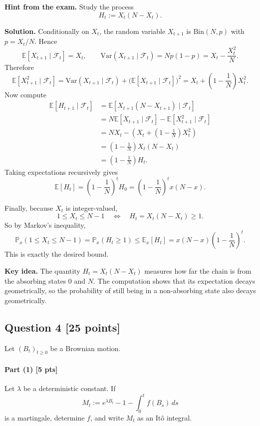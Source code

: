 \documentclass[11pt]{article}
\theoremstyle{definition}
\begin{document}
\textbf{Hint from the exam.} Study the process
\[
H_t:=X_t(N-X_t).
\]

\textbf{Solution.}
Conditionally on \(X_t\), the random variable \(X_{t+1}\) is \(\mathrm{Bin}(N,p)\) with \(p=X_t/N\). Hence
\[
\mathbb E[X_{t+1}\mid \mathcal F_t]=X_t,
\qquad
\mathrm{Var}(X_{t+1}\mid \mathcal F_t)=Np(1-p)=X_t-\frac{X_t^2}{N}.
\]
Therefore
\[
\mathbb E[X_{t+1}^2\mid \mathcal F_t]
=
\mathrm{Var}(X_{t+1}\mid \mathcal F_t)+\bigl(\mathbb E[X_{t+1}\mid \mathcal F_t]\bigr)^2
=
X_t+\left(1-\frac1N\right)X_t^2.
\]
Now compute
\begin{align*}
\mathbb E[H_{t+1}\mid \mathcal F_t]
&=
\mathbb E[X_{t+1}(N-X_{t+1})\mid \mathcal F_t]\\
&=
N\mathbb E[X_{t+1}\mid \mathcal F_t]-\mathbb E[X_{t+1}^2\mid \mathcal F_t]\\
&=
NX_t-\left(X_t+\left(1-\frac1N\right)X_t^2\right)\\
&=
\left(1-\frac1N\right)X_t(N-X_t)\\
&=
\left(1-\frac1N\right)H_t.
\end{align*}
Taking expectations recursively gives
\[
\mathbb E[H_t]=\left(1-\frac1N\right)^t H_0
=\left(1-\frac1N\right)^t x(N-x).
\]

Finally, because \(X_t\) is integer-valued,
\[
1\le X_t\le N-1
\quad \Longleftrightarrow \quad
H_t=X_t(N-X_t)\ge 1.
\]
So by Markov's inequality,
\[
\mathbb P_x(1\le X_t\le N-1)
=
\mathbb P_x(H_t\ge 1)
\le
\mathbb E_x[H_t]
=
x(N-x)\left(1-\frac1N\right)^t.
\]
This is exactly the desired bound.

\begin{summarybox}
\textbf{Key idea.} The quantity \(H_t=X_t(N-X_t)\) measures how far the chain is from the absorbing states \(0\) and \(N\). The computation shows that its expectation decays geometrically, so the probability of still being in a non-absorbing state also decays geometrically.
\end{summarybox}

\subsection*{Question 4 \hfill [25 points]}
Let \((B_t)_{t\ge 0}\) be a Brownian motion.

\paragraph{Part (1) \hfill [5 pts]}
Let \(\lambda\) be a deterministic constant. If
\[
M_t:=e^{\lambda B_t}-1-\int_0^t f(B_s)\,ds
\]
is a martingale, determine \(f\), and write \(M_t\) as an It\^o integral.
\end{document}
